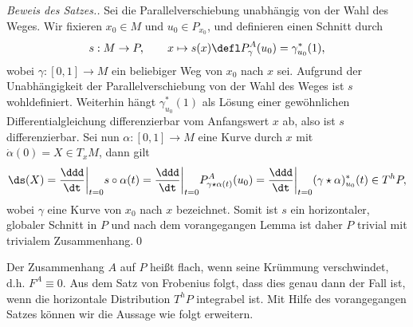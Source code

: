 \documentclass[%
	paper=a5,%
	fleqn,%
	DIV=18,%
	BCOR=0mm,
	fontsize=11pt,
	titlepage=false,%
	bibliography=totoc,
	DIV=18,%
	twoside=true,
	pdftitle=Riemannsche Geometrie,
	pdfauthor=Uwe Semmelmann,
	numbers=noendperiod]%
	{scrbook}
\begin{document}
\begin{proof}[Beweis des Satzes.]
Sei die Parallelverschiebung unabhängig von der Wahl des Weges. Wir fixieren
$x_0\in M$ und $u_0\in P_{x_0}$, und definieren einen Schnitt durch
\begin{align*}
s: M\to P,\qquad x\mapsto s(x) \defl P_\gamma^A(u_0) = \gamma_{u_0}^*(1),
\end{align*}
wobei $\gamma\colon [0,1]\to M$ ein beliebiger Weg von $x_0$ nach $x$ sei. Aufgrund
der Unabhängigkeit der Parallelverschiebung von der Wahl des Weges ist $s$
wohldefiniert. Weiterhin hängt $\gamma_{u_0}^*(1)$ als Lösung einer gewöhnlichen
Differentialgleichung differenzierbar vom Anfangswert $x$ ab, also ist $s$
differenzierbar. Sei nun $\alpha\colon [0,1]\to M$ eine Kurve durch $x$ mit
$\dot{\alpha}(0) = X\in T_xM$, dann gilt
\begin{align*}
\ds(X) = \frac{\ddd}{\dt}\bigg|_{t=0} s\circ\alpha(t)
= \frac{\ddd}{\dt}\bigg|_{t=0} P_{\gamma\star\alpha(t)}^A(u_0)
= \frac{\ddd}{\dt}\bigg|_{t=0} (\gamma\star\alpha)^*_{u_0}(t) \in T^hP,
\end{align*}
wobei $\gamma$ eine Kurve von $x_0$ nach $x$ bezeichnet. Somit ist $s$ ein
horizontaler, globaler Schnitt in $P$ und nach dem vorangegangen Lemma ist daher
$P$ trivial mit trivialem Zusammenhang.\qed 
\end{proof}

Der Zusammenhang $A$ auf $P$ heißt flach, wenn seine Krümmung verschwindet, d.h.
$F^A \equiv 0$. Aus dem Satz von Frobenius folgt, dass dies genau dann der Fall
ist, wenn die horizontale Distribution $T^hP$ integrabel ist. Mit Hilfe des
vorangegangen Satzes können wir die Aussage wie folgt erweitern.
\end{document}
